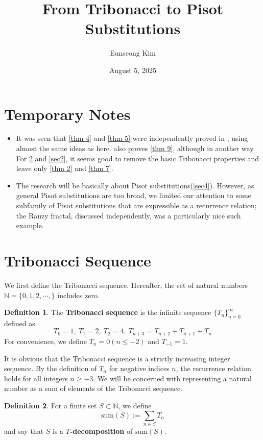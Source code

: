 \documentclass{article}
\title{\textbf{From Tribonacci to Pisot Substitutions}}
\author{Eunseong Kim}
\date{August 5, 2025}
\theoremstyle{definition}
\newtheorem*{definition}{Definition}
\begin{document}
\maketitle

\section{Temporary Notes}
\begin{itemize}
\item It was seen that \cref{thm 4} and \cref{thm 5} were independently proved in \cite{rauzy}, using almost the same ideas as here. \cite{rauzy} also proves \cref{thm 9}, although in another way. For \cref{sec1} and \cref{sec2}, it seems good to remove the basic Tribonacci properties and leave only \cref{thm 2} and \cref{thm 7}.
\item The research will be basically about Pisot substitutions(\cref{sec4}). However, as general Pisot substitutions are too broad, we limited our attention to some subfamily of Pisot substitutions that are expressible as a recurrence relation; the Rauzy fractal, discussed independently, was a particularly nice such example.
\end{itemize}

\section{Tribonacci Sequence}
\label{sec1}

We first define the Tribonacci sequence. Hereafter, the set of natural numbers $\mathbb{N}=\{0,1,2,\cdots,\}$ includes zero.

\begin{definition}
The \textbf{Tribonacci sequence} is the infinite sequence $\{T_n \}_{n=0}^{\infty}$ defined as
\[T_0 = 1,\ T_1=2,\ T_2=4,\ T_{n+3}=T_{n+2}+T_{n+1}+T_n\]
For convenience, we define $T_{n}=0(n\leq -2)$ and $T_{-1}=1$.
\end{definition}

It is obvious that the Tribonacci sequence is a strictly increasing integer sequence. By the definition of $T_n$ for negative indices $n$, the recurrence relation holds for all integers $n\geq -3$. We will be concerned with representing a natural number as a sum of elements of the Tribonacci sequence.

\begin{definition} For a finite set $S\subset \mathbb{N}$, we define
\[\text{sum}(S):=\sum_{n\in S} T_n\]
and say that $S$ is a \textbf{$T$-decomposition} of $\text{sum}(S)$.
\end{definition}
\end{document}
